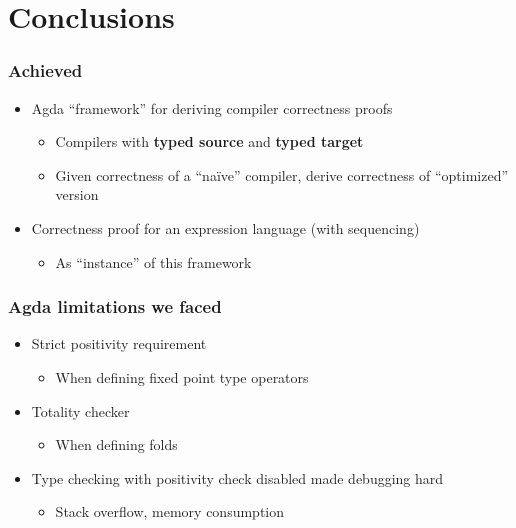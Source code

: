 \section{Conclusions}

    \begin{frame}
        \frametitle{Achieved}

        \begin{itemize}
            \item Agda ``framework'' for deriving compiler correctness proofs
            \begin{itemize}
                \item Compilers with \textbf{typed source} and \textbf{typed target}
                \item Given correctness of a ``naïve'' compiler, derive correctness of ``optimized'' version
            \end{itemize}

           \item Correctness proof for an expression language (with sequencing)
           \begin{itemize}
               \item As ``instance'' of this framework
           \end{itemize}
        \end{itemize}
    \end{frame}

    \begin{frame}
        \frametitle{Agda limitations we faced}

        \begin{itemize}
            \item Strict positivity requirement
            \begin{itemize}
                \item When defining fixed point type operators
            \end{itemize}

            \item Totality checker
            \begin{itemize}
                \item When defining folds
            \end{itemize}

            \item Type checking with positivity check disabled made debugging hard
            \begin{itemize}
                \item Stack overflow, memory consumption
            \end{itemize}
        \end{itemize}
    \end{frame}
             
